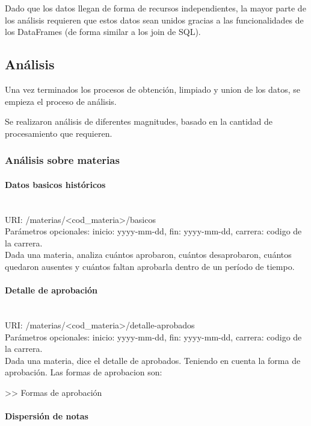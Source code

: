 Dado que los datos llegan de forma de recursos independientes, la mayor parte de los análisis requieren que estos datos sean unidos gracias a las funcionalidades de los DataFrames (de forma similar a los join de SQL).

\subsection{Análisis}

Una vez terminados los procesos de obtención, limpiado y union de los datos, se empieza el proceso de análisis.

Se realizaron análisis de diferentes magnitudes, basado en la cantidad de procesamiento que requieren. 
\subsubsection{Análisis sobre materias}

\paragraph{Datos basicos históricos} \mbox{}\\
URI: /materias/<cod\_materia>/basicos \\
Parámetros opcionales: inicio: yyyy-mm-dd, fin: yyyy-mm-dd, carrera: codigo de la carrera. \\
Dada una materia, analiza cuántos aprobaron, cuántos desaprobaron, cuántos quedaron ausentes y cuántos faltan aprobarla dentro de un período de tiempo.

\paragraph{Detalle de aprobación}\mbox{}\\
URI: /materias/<cod\_materia>/detalle-aprobados \\
Parámetros opcionales: inicio: yyyy-mm-dd, fin: yyyy-mm-dd, carrera: codigo de la carrera. \\
Dada una materia, dice el detalle de aprobados. Teniendo en cuenta la forma de aprobación. Las formas de aprobacion son:

>> Formas de aprobación

\paragraph{Dispersión de notas}\mbox{}\\


